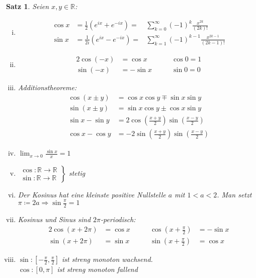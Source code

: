 \documentclass[ngerman,titlepage,twoside, parskip=half*]{scrreprt}
\newcommand*{\R}{\mathbb{R}}
\theoremstyle{plain}
\newtheorem{theorem}{Satz}[section]
\theoremstyle{definition}
\theoremstyle{remark}
\begin{document}
\begin{theorem}
Seien $x,y\in\R$:
\begin{enumerate}[(i)]
  \item \begin{align*}
    \cos x & = \frac{1}{2}(e^{ix}+e^{-ix}) =  &\sum_{k=0}^\infty (-1)^k \frac{x^{2k}}{(2k)!}\\
    \sin x & = \frac{1}{2i}(e^{ix}-e^{-ix}) =  &\sum_{k=1}^\infty (-1)^{k-1}\frac{x^{2k-1}}{(2k-1)!}
  \end{align*}
  \item \begin{alignat*}{2}
    \cos (-x) & = \cos x & \qquad \cos 0 = 1\\
    \sin (-x) & = -\sin x & \qquad \sin 0 =0
  \end{alignat*}
  \item Additionstheoreme:
  \begin{align*}
    \cos (x\pm y) & = \cos x \cos y \mp \sin x \sin y\\
    \sin (x\pm y) & = \sin x \cos y \pm \cos x \sin y\\
    \sin x - \sin y & = 2\cos (\frac{x+y}{2})\sin (\frac{x-y}{2})\\
    \cos x - \cos y & = -2\sin (\frac{x+y}{2})\sin(\frac{x-y}{2})
  \end{align*}
  \item $\lim_{x\rightarrow 0} \frac{\sin x}{x}=1$
  \item $\left.\begin{array}{rcl}
    \cos \colon\R\rightarrow\R\\
    \sin \colon \R\rightarrow\R\end{array}\right\}$ stetig
  \item Der Kosinus hat eine kleinste positive Nullstelle $a$ mit $1<a<2$. Man setzt $\pi\coloneqq2a\Rightarrow
    \sin \frac{\pi}{2}=1$
  \item Kosinus und Sinus sind $2\pi$-periodisch:
    \begin{alignat*}{2}
      \cos (x+2\pi) & = \cos x & \qquad \cos (x+\frac{\pi}{2}) & = -\sin x\\
      \sin (x+2\pi) & = \sin x & \qquad \sin (x+\frac{\pi}{2}) & = \cos x
    \end{alignat*}
  \item $\sin \colon [-\frac{\pi}{2},\frac{\pi}{2}]$ ist streng monoton wachsend.\\
    $\cos \colon [0,\pi]$ ist streng monoton fallend
\end{enumerate}
\end{theorem}
\end{document}

